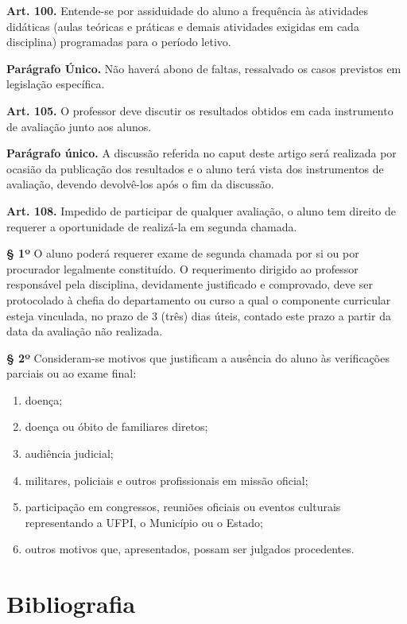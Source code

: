 \documentclass[a4paper, 12pt]{article}
\begin{document}
\vspace{10pt}

\noindent\textbf{Art. 100.} Entende-se por assiduidade do aluno a frequência às atividades didáticas (aulas teóricas e práticas e demais atividades exigidas em cada disciplina) programadas para o período letivo.

\textbf{Parágrafo Único.} Não haverá abono de faltas, ressalvado os casos previstos em legislação específica.

\noindent\textbf{Art. 105.} O professor deve discutir os resultados obtidos em cada instrumento de avaliação junto aos alunos.

\textbf{Parágrafo único.} A discussão referida no caput deste artigo será realizada por ocasião da publicação dos resultados e o aluno terá vista dos instrumentos de avaliação, devendo devolvê-los após o fim da discussão.

\noindent\textbf{Art. 108.} Impedido de participar de qualquer avaliação, o aluno tem direito de requerer a oportunidade de realizá-la em segunda chamada.

\textbf{§ 1º} O aluno poderá requerer exame de segunda chamada por si ou por procurador legalmente constituído. O requerimento dirigido ao professor responsável pela disciplina, devidamente justificado e comprovado, deve ser protocolado à chefia do departamento ou curso a qual o componente curricular esteja vinculada, no prazo de 3 (três) dias úteis, contado este prazo a partir da data da avaliação não realizada.

\textbf{§ 2º} Consideram-se motivos que justificam a ausência do aluno às verificações parciais ou ao exame final:
\begin{enumerate}[label= \alph*)]
    \item doença;
    \item doença ou óbito de familiares diretos;
    \item audiência judicial;
    \item militares, policiais e outros profissionais em missão oficial;
    \item participação em congressos, reuniões oficiais ou eventos culturais
    representando a UFPI, o Município ou o Estado;
    \item outros motivos que, apresentados, possam ser julgados procedentes.
\end{enumerate}

\section{Bibliografia}
\end{document}
